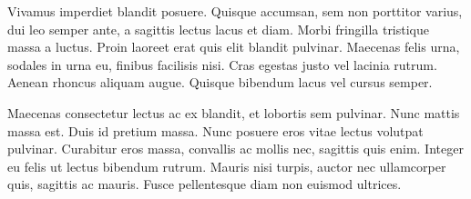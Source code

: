 Vivamus imperdiet blandit posuere. Quisque accumsan, sem non porttitor varius, dui leo semper ante, a sagittis lectus lacus et diam. Morbi fringilla tristique massa a luctus. Proin laoreet erat quis elit blandit pulvinar. Maecenas felis urna, sodales in urna eu, finibus facilisis nisi. Cras egestas justo vel lacinia rutrum. Aenean rhoncus aliquam augue. Quisque bibendum lacus vel cursus semper.

Maecenas consectetur lectus ac ex blandit, et lobortis sem pulvinar. Nunc mattis massa est. Duis id pretium massa. Nunc posuere eros vitae lectus volutpat pulvinar. Curabitur eros massa, convallis ac mollis nec, sagittis quis enim. Integer eu felis ut lectus bibendum rutrum. Mauris nisi turpis, auctor nec ullamcorper quis, sagittis ac mauris. Fusce pellentesque diam non euismod ultrices. \cite{latexcompanion}